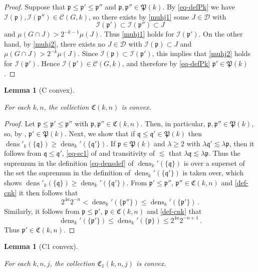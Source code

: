 \documentclass[10pt,a4paper]{article}
\theoremstyle{plain}
\newtheorem{lemma}[theorem]{Lemma}
\theoremstyle{definition}
\numberwithin{equation}{subsection}
\DeclareMathOperator{\dens}{\operatorname{dens}}
\newcommand{\fp}{{\mathfrak p}}
\newcommand{\fP}{{\mathfrak P}}
\newcommand{\fq}{{\mathfrak q}}
\newcommand{\fC}{{\mathfrak C}}
\newcommand{\scI}{{\mathcal{I}}} %
\newcommand{\lean}[1]{}
\newcommand{\uses}[1]{}
\newcommand{\leanok}{}
\begin{document}
\begin{proof}
    \leanok
    Suppose that $\fp \le \fp' \le \fp''$ and $\fp, \fp'' \in \fP(k)$. By \eqref{eq-defPk} we have $\scI(\fp), \scI(\fp'') \in \mathcal{C}(G,k)$, so there exists by \eqref{muhj1} some $J \in \mathcal{D}$ with
    $$
        \scI(\fp') \subset \scI(\fp'') \subset J
    $$
    and $\mu(G \cap J) > 2^{-k-1} \mu(J)$. Thus \eqref{muhj1} holds for $\scI(\fp')$. On the other hand, by \eqref{muhj2}, there exists no $J \in \mathcal{D}$ with $\scI(\fp) \subset J$ and $\mu(G \cap J) > 2^{-k} \mu(J)$. Since $\scI(\fp) \subset \scI(\fp')$, this implies that \eqref{muhj2} holds for $\scI(\fp')$. Hence $\scI(\fp') \in \mathcal{C}(G,k)$, and therefore by \eqref{eq-defPk} $\fp' \in \fP(k)$.
\end{proof}

\begin{lemma}[C convex]
    \label{C-convex}
    \leanok
    \lean{ordConnected_C}
    \uses{P-convex}
    For each $k,n$, the collection $\fC(k,n)$ is convex.
\end{lemma}

\begin{proof}
    \leanok
    Let $\fp \le \fp' \le \fp''$ with $\fp, \fp'' \in \fC(k,n)$. Then, in particular, $\fp, \fp'' \in \fP(k)$, so, by , $\fp' \in \fP(k)$. Next, we show that if $\fq \le \fq' \in \fP(k)$ then $\dens'_k(\{\fq\}) \ge \dens_k'(\{\fq'\})$. If $\fp \in \fP(k)$ and $\lambda \ge 2$ with $\lambda \fq' \lesssim \lambda \fp$, then it follows from $\fq \le \fq'$, \eqref{eq-sc1} of  and transitivity of $\lesssim$ that $\lambda \fq \lesssim \lambda \fp$. Thus the supremum in the definition \eqref{eq-densdef} of $\dens_k'(\{\fq\})$ is over a superset of the set the supremum in the definition of $\dens_k'(\{\fq'\})$ is taken over, which shows $\dens'_k(\{\fq\}) \ge \dens_k'(\{\fq'\})$. From $\fp' \le \fp''$, $\fp'' \in \fC(k,n)$ and \eqref{def-cnk} it then follows that
    $$
        2^{4a}2^{-n} < \dens_k'(\{\fp''\}) \le \dens_k'(\{\fp'\})\,.
    $$
    Similarly, it follows from $\fp \le \fp'$, $\fp \in \fC(k,n)$ and \eqref{def-cnk} that
    $$
        \dens_k'(\{\fp'\}) \le \dens_k'(\{\fp\}) \le 2^{4a}2^{-n+1}\,.
    $$
    Thus $\fp' \in \fC(k,n)$.
\end{proof}

\begin{lemma}[C1 convex]
    \label{C1-convex}
    \leanok
    \lean{ordConnected_C1}
    \uses{C-convex}
    For each $k,n,j$, the collection $\fC_1(k,n,j)$ is convex.
\end{lemma}
\end{document}

